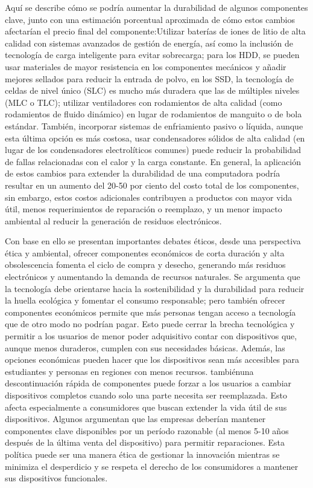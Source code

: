 \documentclass[10pt,journal,compsoc]{IEEEtran}
\begin{document}
Aquí se describe cómo se podría aumentar la durabilidad de algunos componentes clave, junto con una estimación porcentual aproximada de cómo estos cambios afectarían el precio final del componente:Utilizar baterías de iones de litio de alta calidad con sistemas avanzados de gestión de energía, así como la inclusión de tecnología de carga inteligente para evitar sobrecarga; para los HDD, se pueden usar materiales de mayor resistencia en los componentes mecánicos y añadir mejores sellados para reducir la entrada de polvo, en los SSD, la tecnología de celdas de nivel único (SLC) es mucho más duradera que las de múltiples niveles (MLC o TLC); utilizar ventiladores con rodamientos de alta calidad (como rodamientos de fluido dinámico) en lugar de rodamientos de manguito o de bola estándar. También, incorporar sistemas de enfriamiento pasivo o líquida, aunque esta última opción es más costosa, usar condensadores sólidos de alta calidad (en lugar de los condensadores electrolíticos comunes) puede reducir la probabilidad de fallas relacionadas con el calor y la carga constante. En general, la aplicación de estos cambios para extender la durabilidad de una computadora podría resultar en un aumento del 20-50 por ciento del costo total de los componentes, sin embargo, estos costos adicionales contribuyen a productos con mayor vida útil, menos requerimientos de reparación o reemplazo, y un menor impacto ambiental al reducir la generación de residuos electrónicos.

Con base en ello se presentan importantes debates éticos, desde una perspectiva ética y ambiental, ofrecer componentes económicos de corta duración y alta obsolescencia fomenta el ciclo de compra y desecho, generando más residuos electrónicos y aumentando la demanda de recursos naturales. Se argumenta que la tecnología debe orientarse hacia la sostenibilidad y la durabilidad para reducir la huella ecológica y fomentar el consumo responsable; pero también ofrecer componentes económicos permite que más personas tengan acceso a tecnología que de otro modo no podrían pagar. Esto puede cerrar la brecha tecnológica y permitir a los usuarios de menor poder adquisitivo contar con dispositivos que, aunque menos duraderos, cumplen con sus necesidades básicas. Además, las opciones económicas pueden hacer que los dispositivos sean más accesibles para estudiantes y personas en regiones con menos recursos. tambiénuna descontinuación rápida de componentes puede forzar a los usuarios a cambiar dispositivos completos cuando solo una parte necesita ser reemplazada. Esto afecta especialmente a consumidores que buscan extender la vida útil de sus dispositivos. Algunos argumentan que las empresas deberían mantener componentes clave disponibles por un período razonable (al menos 5-10 años después de la última venta del dispositivo) para permitir reparaciones. Esta política puede ser una manera ética de gestionar la innovación mientras se minimiza el desperdicio y se respeta el derecho de los consumidores a mantener sus dispositivos funcionales.
\end{document}
